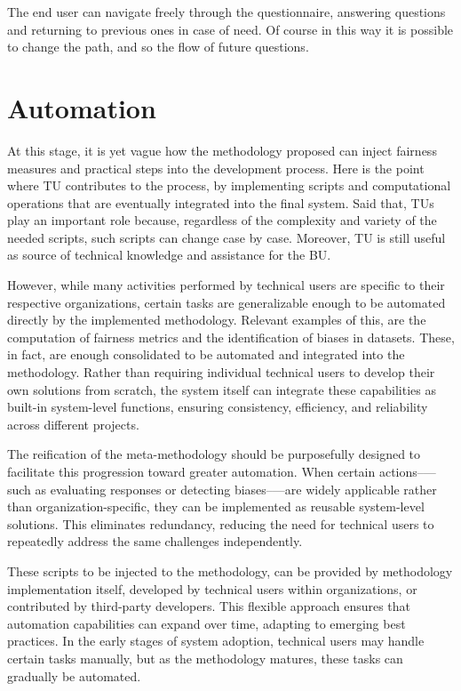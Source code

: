 \documentclass[12pt,a4paper,openright,twoside]{book}
\begin{document}
The end user can navigate freely through the questionnaire, answering questions and returning to previous ones in case of need.
%
Of course in this way it is possible to change the path, and so the flow of future questions.



\section{Automation}

At this stage, it is yet vague how the methodology proposed can inject fairness measures and practical steps into the development process.
%
Here is the point where \acf{TU} contributes to the process, by implementing scripts and computational operations that are eventually integrated into the final system.
%
Said that, \acp{TU} play an important role because, regardless of the complexity and variety of the needed scripts, such scripts can change case by case.
%
Moreover, \ac{TU} is still useful as source of technical knowledge and assistance for the \acf{BU}.

However, while many activities performed by technical users are specific to their respective organizations, certain tasks are generalizable enough to be automated directly by the implemented methodology.
%
Relevant examples of this, are the computation of fairness metrics and the identification of biases in datasets.
%
These, in fact, are enough consolidated to be automated and integrated into the methodology.
%
Rather than requiring individual technical users to develop their own solutions from scratch, the system itself can integrate these capabilities as built-in system-level functions, ensuring consistency, efficiency, and reliability across different projects.

The reification of the meta-methodology should be purposefully designed to facilitate this progression toward greater automation. 
%
When certain actions--—such as evaluating responses or detecting biases--—are widely applicable rather than organization-specific, they can be implemented as reusable system-level solutions.
%
This eliminates redundancy, reducing the need for technical users to repeatedly address the same challenges independently.

These scripts to be injected to the methodology, can be provided by methodology implementation itself, developed by technical users within organizations, or contributed by third-party developers.
%
This flexible approach ensures that automation capabilities can expand over time, adapting to emerging best practices.
%
In the early stages of system adoption, technical users may handle certain tasks manually, but as the methodology matures, these tasks can gradually be automated.
\end{document}
